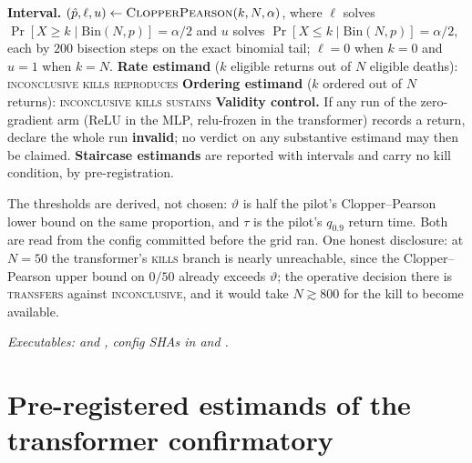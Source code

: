 \documentclass[11pt]{article}
\theoremstyle{definition}
\theoremstyle{remark}
\begin{document}
\begin{algorithm}[t]
\caption{Pre-registered decision procedure (part 2 of 2): intervals, estimands
and the validity control.}
\label{alg:decisao2}
\begin{algorithmic}[1]
\setcounter{ALC@line}{3}
\STATE \textbf{Interval.} $(\hat p,\ell,u)\leftarrow\textsc{ClopperPearson}(k,N,\alpha)$,
where $\ell$ solves $\Pr[X\ge k\mid\mathrm{Bin}(N,p)]=\alpha/2$ and $u$ solves
$\Pr[X\le k\mid\mathrm{Bin}(N,p)]=\alpha/2$, each by $200$ bisection steps on the
exact binomial tail; $\ell=0$ when $k=0$ and $u=1$ when $k=N$.
\STATE \textbf{Rate estimand} ($k$ eligible returns out of $N$ eligible deaths):
  \RETURN \textsc{inconclusive} 
  \RETURN \textsc{kills}
\ELSE
  \RETURN \textsc{reproduces}
\ENDIF
\STATE \textbf{Ordering estimand} ($k$ ordered out of $N$ returns):
 \RETURN \textsc{inconclusive}
 \RETURN \textsc{kills}
\ELSE \RETURN \textsc{sustains}
\ENDIF
\STATE \textbf{Validity control.} If any run of the zero-gradient arm (ReLU in
the MLP, relu-frozen in the transformer) records a return, declare the whole run
\textbf{invalid}; no verdict on any substantive estimand may then be claimed.
\STATE \textbf{Staircase estimands} are reported with intervals and carry no kill
condition, by pre-registration.
\end{algorithmic}
\end{algorithm}

\noindent The thresholds are derived, not chosen: $\vartheta$ is half the pilot's
Clopper--Pearson lower bound on the same proportion, and $\tau$ is the pilot's
$q_{0.9}$ return time. Both are read from the config committed before the grid
ran. One honest disclosure: at $N=50$ the transformer's \textsc{kills} branch is
nearly unreachable, since the Clopper--Pearson upper bound on $0/50$ already
exceeds $\vartheta$; the operative decision there is
\textsc{transfers} against \textsc{inconclusive}, and it would take $N\gtrsim800$
for the kill to become available.

\noindent\textit{Executables:
 and
, config SHAs in
 and
.}

\section{Pre-registered estimands of the transformer confirmatory}\label{app:estimands}
\end{document}
